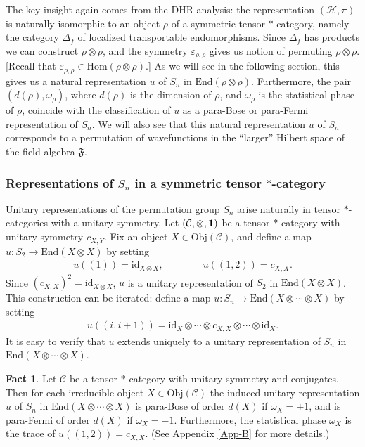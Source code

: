 \documentclass[12pt]{article}
\theoremstyle{definition}
\newtheorem{fact}[thm]{Fact}
\theoremstyle{definition}
\theoremstyle{remark}
\newcommand{\Obj}{\mathrm{Obj}}
\newcommand{\ve}{\varepsilon}
\def\2#1{{\mathcal #1}}
\def\1#1{{\bf #1}}
\def\al#1{{\mathfrak #1}}
\def\om{\omega} \def\Om{\Omega} \def\dd{\partial} \def\D{\Delta}
\newcommand{\Hom}{\mathrm{Hom}}
\newcommand{\End}{\mathrm{End}}
\def\id{\mathrm{id}}
\begin{document}
The key insight again comes from the DHR analysis: the
representation $(\2H ,\pi )$ is naturally isomorphic to
an object $\rho$ of a symmetric tensor $*$-category,
namely the category $\D _f$ of localized transportable
endomorphisms.  Since $\D _f$ has products we can
construct $\rho \otimes \rho$, and the symmetry $\ve
_{\rho ,\rho }$ gives us notion of permuting $\rho
\otimes \rho$.  [Recall that $\ve _{\rho ,\rho }\in
\Hom (\rho \otimes \rho )$.]  As we will see in the
following section, this gives us a natural
representation $u$ of $S_n$ in $\End (\rho \otimes \rho
)$.  Furthermore, the pair $(d(\rho ), \om _\rho )$,
where $d(\rho )$ is the dimension of $\rho$, and $\om
_\rho$ is the statistical phase of $\rho$, coincide
with the classification of $u$ as a para-Bose or
para-Fermi representation of $S_n$.  We will also see
that this natural representation $u$ of $S_n$
corresponds to a permutation of wavefunctions in the
``larger'' Hilbert space of the field algebra $\al F$.

\subsubsection{Representations of $S_n$ in a symmetric tensor
  $*$-category}

Unitary representations of the permutation group $S_n$ arise naturally
in tensor $*$-categories with a unitary symmetry.  Let $(\2C ,\otimes,
\11)$ be a tensor $*$-category with unitary symmetry $c_{X,Y}$.  Fix
an object $X\in \Obj (\2C )$, and define a map $u:S_2\to \End
(X\otimes X)$ by setting
\begin{eqnarray*}
  u((1)) = \id _{X\otimes X} ,\qquad \qquad u((1,2))= c_{X,X}
  .\end{eqnarray*}
Since $(c_{X,X})^{2}=\id _{X\otimes X}$, $u$ is a unitary
representation of $S_2$ in $\End (X\otimes X)$.  This construction can be iterated: define a map $u:S_n\to \End
(X\otimes \cdots \otimes X)$ by setting
\begin{eqnarray*} u((i,i+1))= \id _X\otimes \cdots \otimes
  c_{X,X}\otimes \cdots \otimes \id _X .\end{eqnarray*} It is easy to
verify that $u$ extends uniquely to a unitary representation of $S_n$
in $\End (X\otimes \cdots \otimes X)$.

\begin{fact} Let $\2C$ be a tensor $*$-category with
  unitary symmetry and conjugates.  Then for each
  irreducible object $X\in \Obj (\2C )$ the induced
  unitary representation $u$ of $S_n$ in $\End
  (X\otimes \cdots \otimes X)$ is para-Bose of order
  $d(X)$ if $\om _X =+1$, and is para-Fermi of order
  $d(X)$ if $\om _X=-1$.  Furthermore, the statistical
  phase $\om _X$ is the trace of $u((1,2))=c_{X,X}$.
  (See Appendix \ref{App-B} for more details.)
  \label{risque}
\end{fact}
\end{document}
